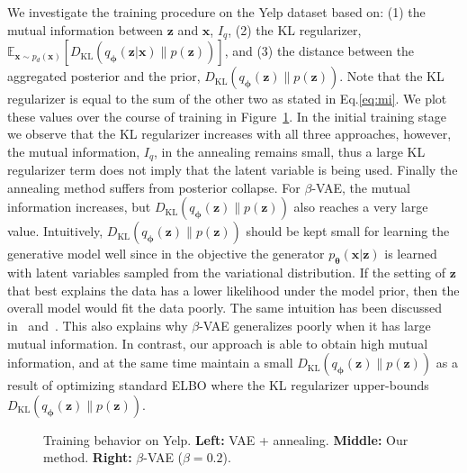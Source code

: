 \documentclass{article} \usepackage{iclr2019_conference,times}
\def\rvx{{\mathbf{x}}}
\def\rvz{{\mathbf{z}}}
\def\vtheta{{\bm{\theta}}}
\def\vphi{{\bm{\phi}}}
\newcommand{\E}{\mathbb{E}}
\newcommand{\KL}{D_{\mathrm{KL}}}
\newcommand{\Ep}{\E_{\rvx\sim p_d(\rvx)}}
\newcommand{\qzx}{q_{\vphi}(\rvz|\rvx)}
\newcommand{\pxz}{p_{\vtheta}(\rvx|\rvz)}
\newcommand{\pz}{p(\rvz)}
\newcommand{\qz}{q_{\vphi}(\rvz)}
\newcommand{\z}{\rvz}
\newcommand{\x}{\rvx}
\begin{document}
We investigate the training procedure on the Yelp dataset based on: (1) the mutual information between $\z$ and $\x$, $I_q$, (2) the KL regularizer, $\Ep[\KL(\qzx \| \pz)]$, and (3) the distance between the aggregated posterior and the prior, $\KL(\qz \| \pz)$. Note that the KL regularizer is equal to the sum of the other two as stated in Eq.\ref{eq:mi}. We plot these values over the course of training in Figure~\ref{fig:mi-comp}. In the initial training stage we observe that the KL regularizer increases with all three approaches, however, the mutual information, $I_q$, in the annealing remains small, thus a large KL regularizer term does not imply that the latent variable is being used. Finally the annealing method suffers from posterior collapse. For $\beta$-VAE, the mutual information increases, but $\KL(\qz \| \pz)$ also reaches a very large value. Intuitively, $\KL(\qz \| \pz)$ should be kept small for learning the generative model well since in the objective the generator $\pxz$ is learned with latent variables sampled from the variational distribution. If the setting of $\z$ that best explains the data has a lower likelihood under the model prior, then the overall model would fit the data poorly.  The same intuition has been discussed in~\citet{zhao2017infovae} and~\citet{tolstikhin2017wasserstein}. This also explains why $\beta$-VAE generalizes poorly when it has large mutual information. In contrast, our approach is able to obtain high mutual information, and at the same time maintain a small $\KL(\qz \| \pz)$ as a result of optimizing standard ELBO where the KL regularizer upper-bounds $\KL(\qz \| \pz)$.



\begin{figure}[!t]
\centering
    \hfill
    \hfill
    \vspace{-12pt}
\caption{Training behavior on Yelp. \textbf{Left: }VAE + annealing. \textbf{Middle: }Our method. \textbf{Right: }$\beta$-VAE ($\beta=0.2$).\label{fig:mi-comp}}
\vspace{-3mm}
\end{figure}
\end{document}
